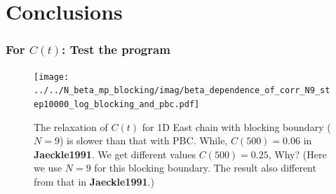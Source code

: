 \documentclass[8pt]{beamer}
\begin{document}

\section{Conclusions}
\begin{frame}
	\frametitle{For $C(t)$: Test the program}
    	\begin{figure}
    	\centering
    	\texttt{[image: ../../N\_beta\_mp\_blocking/imag/beta\_dependence\_of\_corr\_N9\_step10000\_log\_blocking\_and\_pbc.pdf]}
    	\setlength{\abovecaptionskip}{0pt}
    	\caption{ The relaxation of $C(t)$ for 1D East chain with blocking boundary ($N=9$) is slower than that with PBC. While, $C(500)=0.06$ in \textbf{Jaeckle1991}. We get different values $C(500) = 0.25$, Why? (Here we use $N=9$ for this blocking boundary. The result also different from that in  \textbf{Jaeckle1991}.)}
    \end{figure}
\end{frame}
\end{document}
